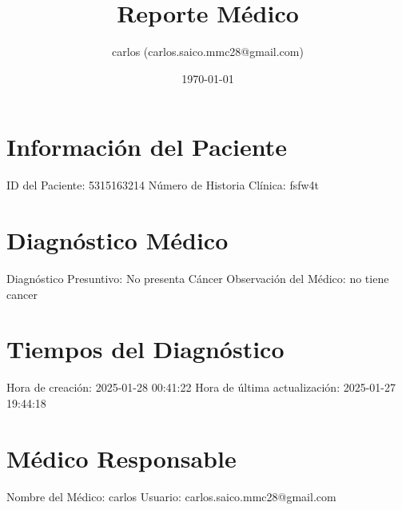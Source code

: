 \documentclass{article}%
\title{Reporte Médico}%
\author{carlos (carlos.saico.mmc28@gmail.com)}%
\date{\today}%
\begin{document}
%
\normalsize%
\maketitle%
\section{Información del Paciente}%
\label{sec:InformacindelPaciente}%
ID del Paciente: 5315163214\newline%
%
Número de Historia Clínica: fsfw4t\newline%

%
\section{Diagnóstico Médico}%
\label{sec:DiagnsticoMdico}%
Diagnóstico Presuntivo: No presenta Cáncer\newline%
%
Observación del Médico:\newline%
no tiene cancer\newline%

%
\section{Tiempos del Diagnóstico}%
\label{sec:TiemposdelDiagnstico}%
Hora de creación: 2025{-}01{-}28 00:41:22\newline%
%
Hora de última actualización: 2025{-}01{-}27 19:44:18\newline%

%
\section{Médico Responsable}%
\label{sec:MdicoResponsable}%
Nombre del Médico: carlos\newline%
%
Usuario: carlos.saico.mmc28@gmail.com\newline%

%
\end{document}
